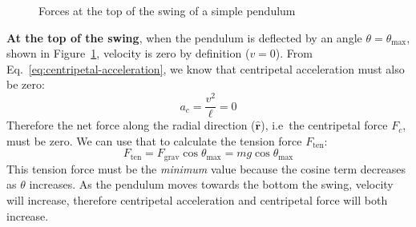 \begin{figure}[b]
  \centering
  \caption{Forces at the top of the swing of a simple pendulum}
  \label{fig:top-swing}
\end{figure}
\textbf{At the top of the swing}, when the pendulum is deflected by an angle
$\theta=\theta_\text{max}$, shown in Figure~\ref{fig:top-swing}, velocity is zero
by definition ($v=0$). From Eq.~\ref{eq:centripetal-acceleration}, we know that
centripetal acceleration must also be zero:
\begin{equation}
  a_c=\frac{v^2}\ell=0 %
\end{equation}
Therefore the net force along the radial direction ($\hat{\bm r}$), i.e\ the
centripetal force $F_c$, must be zero. We can use that to calculate the tension
force $F_\text{ten}$:
\begin{equation}
  F_\text{ten}=F_\text{grav}\cos\theta_\text{max}=mg\cos\theta_\text{max}
\end{equation}
This tension force must be the \emph{minimum} value because the cosine term
decreases as $\theta$ increases. As the pendulum moves towards the bottom the
swing, velocity will increase, therefore centripetal acceleration and
centripetal force will both increase.
